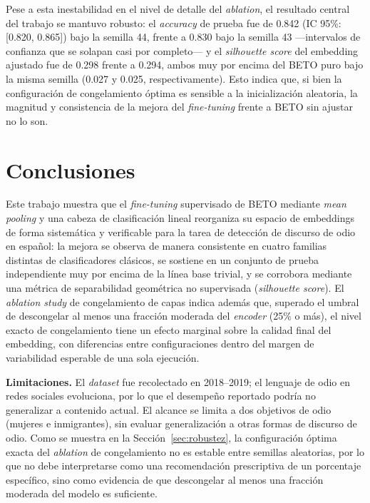 \documentclass[conference]{IEEEtran}
\begin{document}
Pese a esta inestabilidad en el nivel de detalle del \textit{ablation}, el resultado central del trabajo se mantuvo robusto: el \textit{accuracy} de prueba fue de 0.842 (IC 95\%: {[}0.820, 0.865{]}) bajo la semilla 44, frente a 0.830 bajo la semilla 43 —intervalos de confianza que se solapan casi por completo— y el \textit{silhouette score} del embedding ajustado fue de 0.298 frente a 0.294, ambos muy por encima del BETO puro bajo la misma semilla (0.027 y 0.025, respectivamente). Esto indica que, si bien la configuración de congelamiento óptima es sensible a la inicialización aleatoria, la magnitud y consistencia de la mejora del \textit{fine-tuning} frente a BETO sin ajustar no lo son.

\section{Conclusiones}

Este trabajo muestra que el \textit{fine-tuning} supervisado de BETO mediante \textit{mean pooling} y una cabeza de clasificación lineal reorganiza su espacio de embeddings de forma sistemática y verificable para la tarea de detección de discurso de odio en español: la mejora se observa de manera consistente en cuatro familias distintas de clasificadores clásicos, se sostiene en un conjunto de prueba independiente muy por encima de la línea base trivial, y se corrobora mediante una métrica de separabilidad geométrica no supervisada (\textit{silhouette score}). El \textit{ablation study} de congelamiento de capas indica además que, superado el umbral de descongelar al menos una fracción moderada del \textit{encoder} (25\% o más), el nivel exacto de congelamiento tiene un efecto marginal sobre la calidad final del embedding, con diferencias entre configuraciones dentro del margen de variabilidad esperable de una sola ejecución.

\textbf{Limitaciones.} El \textit{dataset} fue recolectado en 2018--2019; el lenguaje de odio en redes sociales evoluciona, por lo que el desempeño reportado podría no generalizar a contenido actual. El alcance se limita a dos objetivos de odio (mujeres e inmigrantes), sin evaluar generalización a otras formas de discurso de odio. Como se muestra en la Sección~\ref{sec:robustez}, la configuración óptima exacta del \textit{ablation} de congelamiento no es estable entre semillas aleatorias, por lo que no debe interpretarse como una recomendación prescriptiva de un porcentaje específico, sino como evidencia de que descongelar al menos una fracción moderada del modelo es suficiente.
\end{document}
